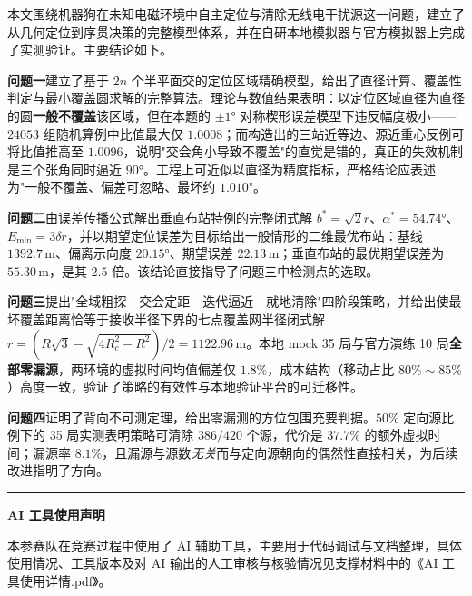 \documentclass[12pt,a4paper]{ctexart}
\begin{document}
本文围绕机器狗在未知电磁环境中自主定位与清除无线电干扰源这一问题，建立了从几何定位到序贯决策的完整模型体系，并在自研本地模拟器与官方模拟器上完成了实测验证。主要结论如下。

\textbf{问题一}建立了基于 $2n$ 个半平面交的定位区域精确模型，给出了直径计算、覆盖性判定与最小覆盖圆求解的完整算法。理论与数值结果表明：以定位区域直径为直径的圆\textbf{一般不覆盖}该区域，但在本题的 $\pm1°$ 对称楔形误差模型下违反幅度极小——$24053$ 组随机算例中比值最大仅 $1.0008$；而构造出的三站近等边、源近重心反例可将比值推高至 $1.0096$，说明"交会角小导致不覆盖"的直觉是错的，真正的失效机制是三个张角同时逼近 $90°$。工程上可近似以直径为精度指标，严格结论应表述为"一般不覆盖、偏差可忽略、最坏约 $1.010$"。

\textbf{问题二}由误差传播公式解出垂直布站特例的完整闭式解 $b^{*}=\sqrt{2}r$、$\alpha^{*}=54.74°$、$E_{\min}=3\delta r$，并以期望定位误差为目标给出一般情形的二维最优布站：基线 $1392.7\,\text{m}$、偏离示向度 $20.15°$、期望误差 $22.13\,\text{m}$；垂直布站的最优期望误差为 $55.30\,\text{m}$，是其 $2.5$ 倍。该结论直接指导了问题三中检测点的选取。

\textbf{问题三}提出"全域粗探—交会定距—迭代逼近—就地清除"四阶段策略，并给出使最坏覆盖距离恰等于接收半径下界的七点覆盖网半径闭式解 $r=(R\sqrt{3}-\sqrt{4R_c^2-R^2})/2=1122.96\,\text{m}$。本地 mock 35 局与官方演练 10 局\textbf{全部零漏源}，两环境的虚拟时间均值偏差仅 $1.8\%$，成本结构（移动占比 $80\%\sim85\%$）高度一致，验证了策略的有效性与本地验证平台的可迁移性。

\textbf{问题四}证明了背向不可测定理，给出零漏测的方位包围充要判据。$50\%$ 定向源比例下的 35 局实测表明策略可清除 $386/420$ 个源，代价是 $37.7\%$ 的额外虚拟时间；漏源率 $8.1\%$，且漏源与源数\emph{无关}而与定向源朝向的偶然性直接相关，为后续改进指明了方向。

\noindent\rule{\textwidth}{0.4pt}

\noindent\textbf{AI 工具使用声明}

本参赛队在竞赛过程中使用了 AI 辅助工具，主要用于代码调试与文档整理，具体使用情况、工具版本及对 AI 输出的人工审核与核验情况见支撑材料中的《AI 工具使用详情.pdf》。
\end{document}

